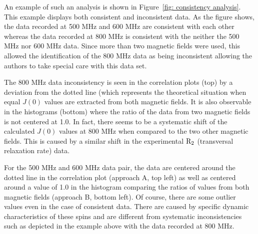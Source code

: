 An example of such an analysis is shown in Figure~\ref{fig: consistency analysis}.
This example displays both consistent and inconsistent data.
As the figure shows, the data recorded at 500 MHz and 600 MHz are consistent with each other whereas the data recorded at 800 MHz is consistent with the neither the 500 MHz nor 600 MHz data.
Since more than two magnetic fields were used, this allowed the identification of the 800 MHz data as being inconsistent allowing the authors to take special care with this data set.

The 800 MHz data inconsistency is seen in the correlation plots (top) by a deviation from the dotted line (which represents the theoretical situation when equal $J(0)$ values are extracted from both magnetic fields.
It is also observable in the histograms (bottom) where the ratio of the data from two magnetic fields is not centered at 1.0.
In fact, there seems to be a systematic shift of the calculated $J(0)$ values at 800 MHz when compared to the two other magnetic fields.
This is caused by a similar shift in the experimental $\mathrm{R}_2$ (transversal relaxation rate) data.

For the 500 MHz and 600 MHz data pair, the data are centered around the dotted line in the correlation plot (approach A, top left) as well as centered around a value of 1.0 in the histogram comparing the ratios of values from both magnetic fields (approach B, bottom left).
Of course, there are some outlier values even in the case of consistent data.
There are caused by specific dynamic characteristics of these spins and are different from systematic inconsistencies such as depicted in the example above with the data recorded at 800 MHz.
